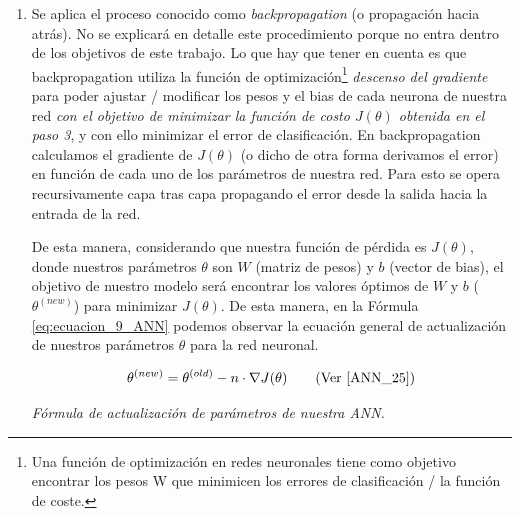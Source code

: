 \documentclass[12pt,a4paper]{article}
\begin{document}
\begin{sloppypar}
\begin{enumerate}
La función de pérdida $J(\theta)$ será diferente para cada modelo. Más adelante obtendremos los cálculos de las $J(\theta)$ que tendremos en consideración para nuestra implementación: Fórmulas \ref{eq:ecuacion_11_NLP} y \ref{eq:ecuacion_21_NLP}, siendo esta última la que finalmente utilizaremos en nuestro modelo y buscaremos minimizar. Ambas funciones de costo son la sumatoria sobre los costos individuales en los que incurre la red al clasificar cada elemento del conjunto de entrenamiento, y se calculan 1 vez por epoch\footnote{Epoch es un hiper-parámetro de nuestra red neuronal, donde cada epoch representa una iteración sobre nuestros datos de entrenamiento completo. Esta iteración incluye el cálculo de los forward propagation y back propagation correspondientes.}.

\item Se aplica el proceso conocido como \textit{backpropagation} (o propagación hacia atrás). No se explicará en detalle este procedimiento porque no entra dentro de los objetivos de este trabajo. Lo que hay que tener en cuenta es que backpropagation utiliza la función de optimización\footnote{Una función de optimización en redes neuronales tiene como objetivo encontrar los pesos W que minimicen los errores de clasificación / la función de coste.} \textit{descenso del gradiente} para poder ajustar / modificar los pesos y el bias de cada neurona de nuestra red \textit{con el objetivo de minimizar la función de costo $J(\theta)$ obtenida en el paso 3}, y con ello minimizar el error de clasificación. En backpropagation calculamos el gradiente de $J(\theta)$ (o dicho de otra forma derivamos el error) en función de cada uno de los parámetros de nuestra red. Para esto se opera recursivamente capa tras capa propagando el error desde la salida hacia la entrada de la red.

De esta manera, considerando que nuestra función de pérdida es $J(\theta)$, donde nuestros parámetros $\theta$ son $W$ (matriz de pesos) y $b$ (vector de bias), el objetivo de nuestro modelo será encontrar los valores óptimos de $W$ y $b$ ($\theta^{(new)}$) para minimizar $J(\theta)$. De esta manera, en la Fórmula \ref{eq:ecuacion_9_ANN} podemos observar la ecuación general de actualización de nuestros parámetros $\theta$ para la red neuronal.
 
\begin{equation}\label{eq:ecuacion_9_ANN}
\theta^{(new)} = \theta^{(old)} - n \cdot \nabla J(\theta)   \qquad \text{(Ver \cite{ANN_25})}
\end{equation}
\begin{center}
\textit{Fórmula de actualización de parámetros de nuestra ANN.}
\end{center}


\end{enumerate}
\end{sloppypar}
\end{document}
